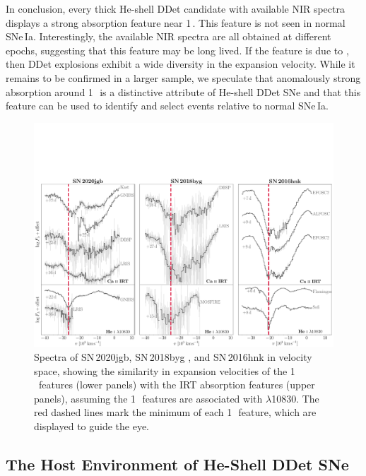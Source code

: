 \documentclass[twocolumn]{aastex631}
\newcommand{\sn}{SN\,2020jgb}
\begin{document}
In conclusion, every thick He-shell DDet candidate with available NIR spectra displays a strong absorption feature near 1\,\micron. This feature is not seen in normal SNe\,Ia. Interestingly, the available NIR spectra are all obtained at different epochs, suggesting that this feature may be long lived. If the feature is due to , then DDet explosions exhibit a wide diversity in the expansion velocity. While it remains to be confirmed in a larger sample, we speculate that anomalously strong absorption around 1\,\micron\ is a distinctive attribute of He-shell DDet SNe and that this feature can be used to identify and select events relative to normal SNe\,Ia.

\begin{figure}
    \centering
    \includegraphics[width=\textwidth]{CaII_HeI_hvf.pdf}
    \caption{Spectra of \sn, SN\,2018byg \citep{de_18byg_2019}, and SN\,2016hnk \citep{galbany_16hnk_2019} in velocity space, showing the similarity in expansion velocities of the 1\,\micron\ features (lower panels) with the  IRT absorption features (upper panels), assuming the 1\,\micron\ features are associated with  $\lambda$10830. The red dashed lines mark the minimum of each 1\,\micron\ feature, which are displayed to guide the eye.}
    \label{fig:hvf_comp}
\end{figure}

\subsection{The Host Environment of He-Shell DDet SNe} \label{sec:host}
\end{document}
